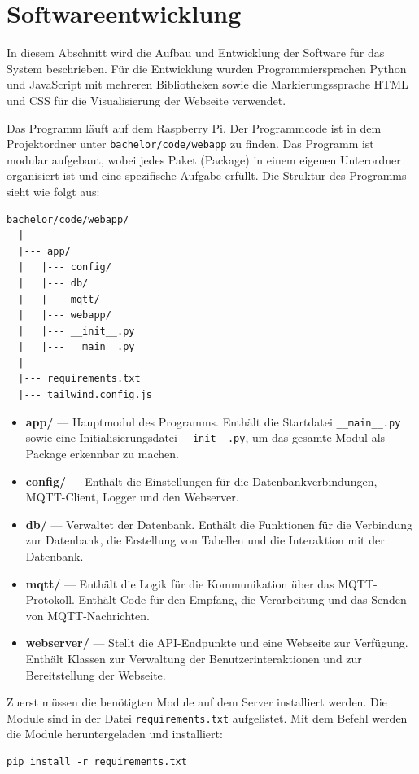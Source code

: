\documentclass[12pt, letterpaper]{article}
\begin{document}
\section{Softwareentwicklung}
\par In diesem Abschnitt wird die Aufbau und Entwicklung der Software für das System beschrieben. Für die Entwicklung wurden Programmiersprachen Python und JavaScript mit mehreren Bibliotheken sowie die Markierungssprache HTML und CSS für die Visualisierung der Webseite verwendet.
\par Das Programm läuft auf dem Raspberry Pi. Der Programmcode ist in dem Projektordner unter \texttt{bachelor/code/webapp} zu finden. Das Programm ist modular aufgebaut, wobei jedes Paket (Package) in einem eigenen Unterordner organisiert ist und eine spezifische Aufgabe erfüllt. Die Struktur des Programms sieht wie folgt aus:
\begin{Verbatim}[frame=single]
  bachelor/code/webapp/
  |
  |--- app/
  |   |--- config/
  |   |--- db/
  |   |--- mqtt/
  |   |--- webapp/
  |   |--- __init__.py
  |   |--- __main__.py
  |
  |--- requirements.txt
  |--- tailwind.config.js  
\end{Verbatim}
\begin{itemize}
  \item \textbf{app/} --- Hauptmodul des Programms. Enthält die Startdatei \texttt{\_\_main\_\_.py} sowie eine Initialisierungsdatei \texttt{\_\_init\_\_.py}, um das gesamte Modul als Package erkennbar zu machen.
  \item \textbf{config/} --- Enthält die Einstellungen für die Datenbankverbindungen, MQTT-Client, Logger und den Webserver.
  \item \textbf{db/} --- Verwaltet der Datenbank. Enthält die Funktionen für die Verbindung zur Datenbank, die Erstellung von Tabellen und die Interaktion mit der Datenbank.
  \item \textbf{mqtt/} --- Enthält die Logik für die Kommunikation über das MQTT-Protokoll. Enthält Code für den Empfang, die Verarbeitung und das Senden von MQTT-Nachrichten.
  \item \textbf{webserver/} --- Stellt die API-Endpunkte und eine Webseite zur Verfügung. Enthält Klassen zur Verwaltung der Benutzerinteraktionen und zur Bereitstellung der Webseite.
\end{itemize} 
\par Zuerst müssen die benötigten Module auf dem Server installiert werden. Die Module sind in der Datei \texttt{requirements.txt} aufgelistet. Mit dem Befehl werden die Module heruntergeladen und installiert:
\begin{Verbatim}[frame=single]
  pip install -r requirements.txt
\end{Verbatim}
\end{document}
